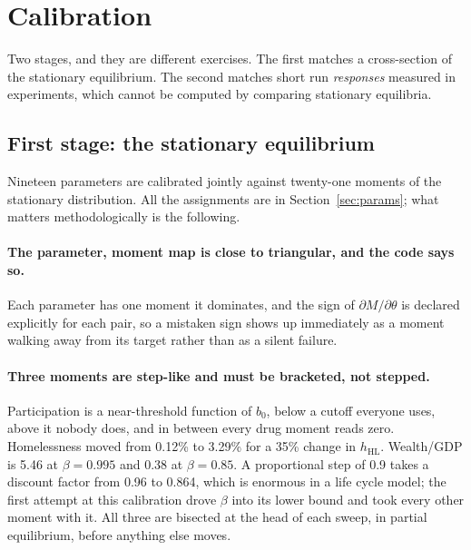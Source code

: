 \documentclass[11pt]{article}
\begin{document}
\section{Calibration}
\label{sec:calib}

Two stages, and they are different exercises. The first matches a cross-section
of the stationary equilibrium. The second matches short run \emph{responses}
measured in experiments, which cannot be computed by comparing stationary
equilibria.

\subsection{First stage: the stationary equilibrium}

Nineteen parameters are calibrated jointly against twenty-one moments of the
stationary distribution. All the assignments are in Section~\ref{sec:params};
what matters methodologically is the following.

\paragraph{The parameter, moment map is close to triangular, and the code says
so.} Each parameter has one moment it dominates, and the sign of
$\partial M/\partial\theta$ is declared explicitly for each pair, so a mistaken
sign shows up immediately as a moment walking away from its target rather than as
a silent failure.

\paragraph{Three moments are step-like and must be bracketed, not stepped.}
Participation is a near-threshold function of $b_0$, below a cutoff everyone
uses, above it nobody does, and in between every drug moment reads zero.
Homelessness moved from 0.12\% to 3.29\% for a 35\% change in $h_{\text{HL}}$.
Wealth/GDP is 5.46 at $\beta=0.995$ and 0.38 at $\beta=0.85$. A proportional step
of 0.9 takes a discount factor from 0.96 to 0.864, which is enormous in a
life cycle model; the first attempt at this calibration drove $\beta$ into its
lower bound and took every other moment with it. All three are bisected at the
head of each sweep, in partial equilibrium, before anything else moves.
\end{document}
